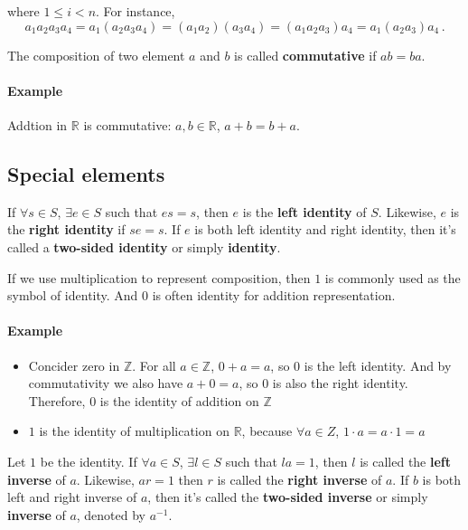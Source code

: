 \documentclass[UTF8]{ctexart}
\theoremstyle{mystyle}
\theoremstyle{myremark}
\theoremstyle{plain}
\newcommand{\R}{\mathbb R}
\newcommand{\Z}{\mathbb Z}
\begin{document}
where $ 1 \leqslant i < n $. For instance,
\[ a_1 a_2 a_3 a_4 = a_1 (a_2 a_3 a_4) = (a_1 a_2) (a_3 a_4) = (a_1 a_2 a_3) a_4 = a_1 (a_2 a_3) a_4 \,.\]

\begin{definition}
    The composition of two element $ a $ and $ b $ is called \textbf{commutative} if $ ab = ba $.
\end{definition}

\paragraph{Example}
Addtion in $ \R $ is commutative: $ a, b \in \R $, $ a + b = b + a $.

\subsection{Special elements}
\begin{definition}
    If $ \forall s \in S $, $ \exists e \in S $ such that $ es = s $, then $ e $ is the \textbf{left identity} of $ S $. Likewise, $ e $ is the \textbf{right identity} if $ se = s $. If $ e $ is both left identity and right identity, then it's called a \textbf{two-sided identity} or simply \textbf{identity}.
\end{definition}

If we use multiplication to represent composition, then $ 1 $ is commonly used as the symbol of identity. And $ 0 $ is often identity for addition representation.

\paragraph{Example}
\begin{itemize}
    \item Concider zero in $ \Z $. For all $ a \in \Z $, $ 0 + a = a $, so $ 0 $ is the left identity. And by commutativity we also have $ a + 0 = a $, so $ 0 $ is also the right identity. Therefore, $ 0 $ is the identity of addition on $ \Z $
    \item $ 1 $ is the identity of multiplication on $ \R $, because $ \forall a \in Z $, $ 1 \cdot a = a \cdot 1 = a $
\end{itemize}

\begin{definition}
    Let $ 1 $ be the identity. If $ \forall a \in S $, $ \exists l \in S $ such that $ l a = 1 $, then $ l $ is called the \textbf{left inverse} of $ a $. Likewise, $ a r = 1 $ then $ r $ is called the \textbf{right inverse} of $ a $. If $ b $ is both left and right inverse of $ a $, then it's called the \textbf{two-sided inverse} or simply \textbf{inverse} of $ a $, denoted by $ a^{-1} $.
\end{definition}
\end{document}
